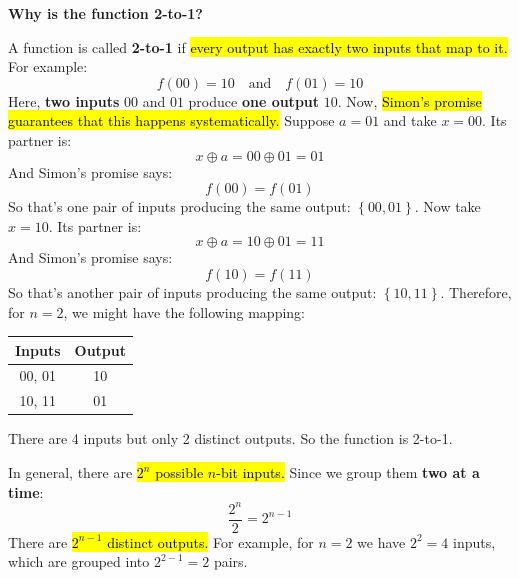 \highspace
\begin{flushleft}
    \textcolor{Green3}{ \textbf{Why is the function 2-to-1?}}
\end{flushleft}
A function is called \textbf{2-to-1} if \hl{every output has exactly two inputs that map to it.} For example:
\begin{equation*}
    f(00) = 10 \quad \text{and} \quad f(01) = 10
\end{equation*}
Here, \textbf{two inputs} $00$ and $01$ produce \textbf{one output} $10$. Now, \hl{Simon's promise guarantees that this happens systematically.} Suppose $a = 01$ and take $x = 00$. Its partner is:
\begin{equation*}
    x \oplus a = 00 \oplus 01 = 01
\end{equation*}
And Simon's promise says:
\begin{equation*}
    f(00) = f(01)
\end{equation*}
So that's one pair of inputs producing the same output: $\left\{00, 01\right\}$. Now take $x = 10$. Its partner is:
\begin{equation*}
    x \oplus a = 10 \oplus 01 = 11
\end{equation*}
And Simon's promise says:
\begin{equation*}
    f(10) = f(11)
\end{equation*}
So that's another pair of inputs producing the same output: $\left\{10, 11\right\}$. Therefore, for $n=2$, we might have the following mapping:
\begin{center}
    \begin{tabular}{@{} c c @{}}
        \toprule
        Inputs & Output \\
        \midrule
        00, 01 & 10 \\
        10, 11 & 01 \\
        \bottomrule
    \end{tabular}
\end{center}

\noindent
There are 4 inputs but only 2 distinct outputs. So the function is 2-to-1.

\highspace
In general, there are \hl{$2^n$ possible $n$-bit inputs.} Since we group them \textbf{two at a time}:
\begin{equation}\label{eq:distinct-outputs}
    \frac{2^{n}}{2} = 2^{n-1}
\end{equation}
There are \hl{$2^{n-1}$ distinct outputs.} For example, for $n=2$ we have $2^2 = 4$ inputs, which are grouped into $2^{2-1} = 2$ pairs.

